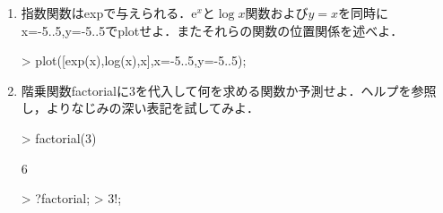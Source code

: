\begin{enumerate}
\item 指数関数はexpで与えられる．$\mbox{e}^x$と$\log x$関数および$y = x$を同時にx=-5..5,y=-5..5でplotせよ．またそれらの関数の位置関係を述べよ．
\begin{MapleInput}
> plot([exp(x),log(x),x],x=-5..5,y=-5..5);
\end{MapleInput}

\item 階乗関数factorialに3を代入して何を求める関数か予測せよ．ヘルプを参照し，よりなじみの深い表記を試してみよ．
\begin{MapleInput}
> factorial(3)
\end{MapleInput}
\begin{MapleOutput}
6
\end{MapleOutput}
\begin{MapleInput}
> ?factorial;
> 3!;
\end{MapleInput}

\end{enumerate}
